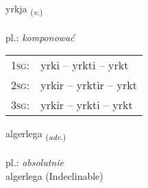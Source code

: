 \documentclass[frontgrid, backgrid]{flacards}\usepackage[]{graphicx}\usepackage[]{xcolor}
\begin{document}
\renewcommand{\flhead}{\vskip5pt \fboxsep=0pt {\small\bfseries\footnotesize Sagnorð | Verb}}
\renewcommand{\fcfoot}{\vskip5pt \fboxsep=0pt \hspace{2pt}{\small\bfseries\footnotesize 2K}}

\renewcommand{\blhead}{\vskip5pt {\small\bfseries\footnotesize Sagnorð | Verb }}
\renewcommand{\bcfoot}{\vskip5pt \hspace{2pt}{\small\bfseries\footnotesize 2K}}


{yrkja \small{\textsubscript{(\textit{v.})}} \\[1ex] %
\textphonetic{[ɪr̥ca]} \\
pl.: \emph{komponować} \\  [2ex]
\renewcommand*{\arraystretch}{0.8}
\begin{tabular}{p{1cm}l}
\textsc{1sg}: & yrki -- yrkti -- yrkt \\ 
\textsc{2sg}: & yrkir -- yrktir -- yrkt \\ 
\textsc{3sg}: & yrkir -- yrkti -- yrkt \\ 
\end{tabular}
}


\renewcommand{\flhead}{\vskip5pt \fboxsep=0pt {\small\bfseries\footnotesize Atviksorð | Adverb}}
\renewcommand{\fcfoot}{\vskip5pt \fboxsep=0pt \hspace{2pt}{\small\bfseries\footnotesize 2K}}

\renewcommand{\blhead}{\vskip5pt {\small\bfseries\footnotesize Atviksorð | Adverb }}
\renewcommand{\bcfoot}{\vskip5pt \hspace{2pt}{\small\bfseries\footnotesize 2K}}


{algerlega \small{\textsubscript{(\textit{adv.})}} \\[1ex]
\textphonetic{[alcɛrlɛɣa]} \\
pl.: \emph{absolutnie} \\  [2ex]
algerlega (Indeclinable)}

\renewcommand{\flhead}{\vskip5pt \fboxsep=0pt {\small\bfseries\footnotesize Atviksorð | Adverb}}
\renewcommand{\fcfoot}{\vskip5pt \fboxsep=0pt \hspace{2pt}{\small\bfseries\footnotesize 2K}}
\end{document}

